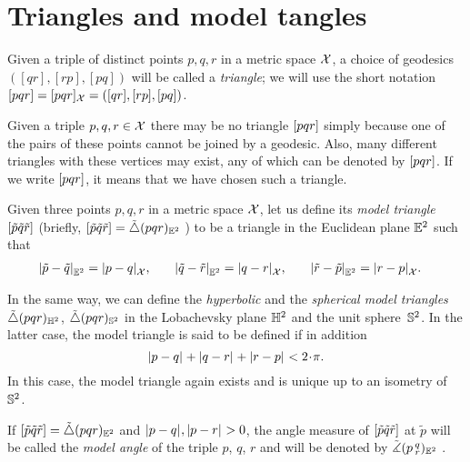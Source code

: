\section{Triangles and model tangles}

Given a triple of distinct points $p,q,r$ in a metric space $\mathcal{X}$, a choice of geodesics $([q r], [r p], [p q])$ will be called a \emph{triangle}; we will use the short notation 
$[pqr]=[pqr]_{\mathcal{X}}=([q r], [r p], [p q])$\index{$\trig {{*}}{{*}}{{*}}$}.

Given a triple $p,q,r\in \mathcal{X}$ there may be no triangle 
$[pqr]$ simply because one of the pairs of these points cannot be joined by a geodesic.
Also, many different triangles with these vertices may exist, any of which can be denoted by $[pqr]$.
If we write $[pqr]$, it means that we have chosen such a triangle.


Given three points $p,q,r$ in a metric space $\mathcal{X}$,
let us define its \emph{model triangle} $[\tilde p\tilde q\tilde r]$ 
(briefly, 
$[\tilde p\tilde q\tilde r]=\tilde\triangle(p q r)_{\mathbb{E}^2}$%
\index{$\modtrig$}) to be a triangle in the Euclidean plane $\mathbb{E}^2$ such that
\begin{align*}|{\tilde p}-{\tilde q}|_{\mathbb{E}^2}^{{}}&=|{p}-{q}|_{\mathcal{X}}^{{}},
&
\quad|{\tilde q}-{\tilde r}|_{\mathbb{E}^2}^{{}}&=|{q}-{r}|_{\mathcal{X}}^{{}},
&
\quad|{\tilde r}-{\tilde p}|_{\mathbb{E}^2}^{{}}&=|{r}-{p}|_{\mathcal{X}}^{{}}.
\end{align*}

In the same way, we can define the \emph{hyperbolic} and the \emph{spherical model triangles} $\tilde\triangle(p q r)_{\mathbb{H}^2}$, $\tilde\triangle(p q r)_{\mathbb{S}^2}$
in the Lobachevsky plane $\mathbb{H}^2$ and the unit sphere~$\mathbb{S}^2$.
In the latter case, the model triangle is said to be defined if in addition
\[\dist{p}{q}{}+\dist{q}{r}{}+\dist{r}{p}{}< 2\cdot\pi.\]
In this case, the model triangle again exists and is unique up to an isometry of~$\mathbb{S}^2$.

If 
$[\tilde p\tilde q\tilde r]=\tilde\triangle(p q r)_{\mathbb{E}^2}$ 
and $|{p}-{q}|_{}^{{}},|{p}-{r}|_{}^{{}}>0$, 
the angle measure of 
$[\tilde p\tilde q\tilde r]$ at $\tilde p$ 
will be called the \emph{model angle} of the triple $p$, $q$, $r$ and will be denoted by
$\tilde\measuredangle(p\,{}^{q}_{r})_{\mathbb{E}^2}$%
.\label{page:model-angle}


